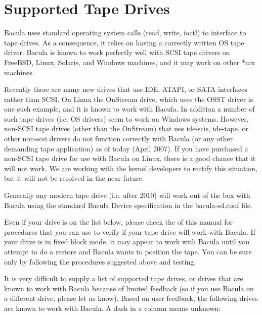 
\chapter{Supported Tape Drives}
\label{SupportedDrives}

Bacula uses standard operating system calls (read, write, ioctl) to 
interface to tape drives.  As a consequence, it relies on having a
correctly written OS tape driver. Bacula is known to work perfectly well
with SCSI tape drivers on FreeBSD, Linux, Solaris, and Windows machines,
and it may work on other *nix machines.

Recently there are many new drives that use IDE, ATAPI, or
SATA interfaces rather than SCSI. On Linux the OnStream drive, which uses
the OSST driver is one such
example, and it is known to work with Bacula. In addition a number of such
tape drives (i.e. OS drivers) seem to work on Windows systems.  However,
non-SCSI tape drives (other than the OnStream) that use ide-scis, ide-tape, 
or other non-scsi drivers do not function correctly with Bacula (or any
other demanding tape application) as of today (April 2007).  If you
have purchased a non-SCSI tape drive for use with Bacula on Linux, there
is a good chance that it will not work. We are working with the kernel
developers to rectify this situation, but it will not be resolved in the 
near future.

Generally any modern tape drive (i.e. after 2010) will work out
of the box with Bacula using the standard Bacula Device specification
in the bacula-sd.conf file.

Even if your drive is on the list below, please check the 
 of this manual for
procedures that you can use to verify if your tape drive will work with
Bacula. If your drive is in fixed block mode, it may appear to work with
Bacula until you attempt to do a restore and Bacula wants to position the
tape. You can be sure only by following the procedures suggested above and
testing. 

It is very difficult to supply a list of supported tape drives, or drives that
are known to work with Bacula because of limited feedback (so if you use
Bacula on a different drive, please let us know). Based on user feedback, the
following drives are known to work with Bacula. A dash in a column means
unknown: 

